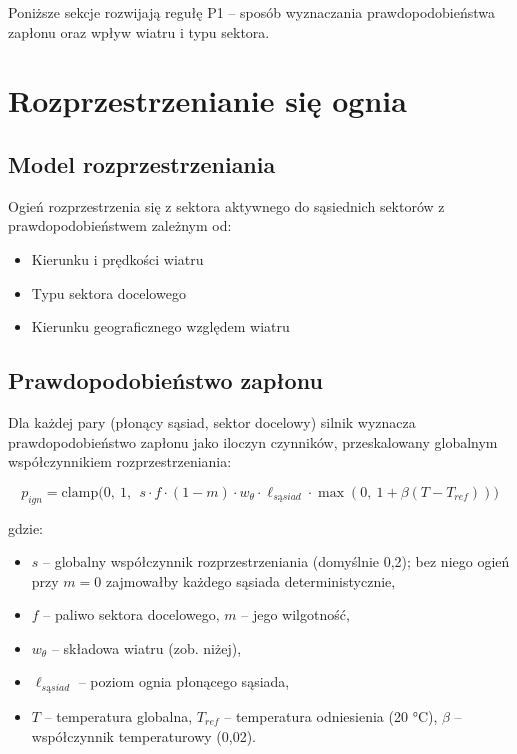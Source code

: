 Poniższe sekcje rozwijają regułę P1 -- sposób wyznaczania prawdopodobieństwa zapłonu oraz wpływ wiatru i typu sektora.

\section{Rozprzestrzenianie się ognia}

\subsection{Model rozprzestrzeniania}

Ogień rozprzestrzenia się z sektora aktywnego do sąsiednich sektorów z prawdopodobieństwem zależnym od:
\begin{itemize}
    \item Kierunku i prędkości wiatru
    \item Typu sektora docelowego
    \item Kierunku geograficznego względem wiatru
\end{itemize}

\subsection{Prawdopodobieństwo zapłonu}
\label{sec:ignition}

Dla każdej pary (płonący sąsiad, sektor docelowy) silnik wyznacza prawdopodobieństwo zapłonu jako iloczyn czynników, przeskalowany globalnym współczynnikiem rozprzestrzeniania:

\begin{equation}
p_{ign} = \mathrm{clamp}\!\Big(0,\ 1,\ \ s \cdot f \cdot (1 - m) \cdot w_{\theta} \cdot \ell_{sąsiad} \cdot \max(0,\ 1 + \beta (T - T_{ref}))\Big)
\end{equation}

gdzie:
\begin{itemize}
    \item $s$ -- globalny współczynnik rozprzestrzeniania (domyślnie 0,2); bez niego ogień przy $m=0$ zajmowałby każdego sąsiada deterministycznie,
    \item $f$ -- paliwo sektora docelowego, $m$ -- jego wilgotność,
    \item $w_{\theta}$ -- składowa wiatru (zob. niżej),
    \item $\ell_{sąsiad}$ -- poziom ognia płonącego sąsiada,
    \item $T$ -- temperatura globalna, $T_{ref}$ -- temperatura odniesienia (20 °C), $\beta$ -- współczynnik temperaturowy (0,02).
\end{itemize}

